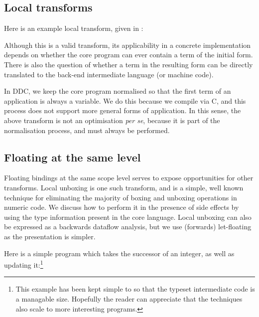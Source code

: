 \subsection{Local transforms}

Here is an example local transform, given in \cite{peyton-jones:let-floating}:


Although this is a valid transform, its applicability in a concrete implementation depends on whether the core program can ever contain a term of the initial form. There is also the question of whether a term in the resulting form can be directly translated to the back-end intermediate language (or machine code).

In DDC, we keep the core program normalised so that the first term of an application is always a variable. We do this because we compile via C, and this process does not support more general forms of application. In this sense, the above transform is not an optimisation \emph{per se}, because it is part of the normalisation process, and must always be performed.

\subsection{Floating at the same level}
\label{Core:Optimisation:floating-same-level}
Floating bindings at the same scope level serves to expose opportunities for other transforms. Local unboxing is one such transform, and is a simple, well known technique for eliminating the majority of boxing and unboxing operations in numeric code. We discuss how to perform it in the presence of side effects by using the type information present in the core language. Local unboxing can also be expressed as a backwards dataflow analysis, but we use (forwards) let-floating as the presentation is simpler.

Here is a simple program which takes the successor of an integer, as well as updating it:\footnote{This example has been kept simple to so that the typeset intermediate code is a managable size. Hopefully the reader can appreciate that the techniques also scale to more interesting programs.}



